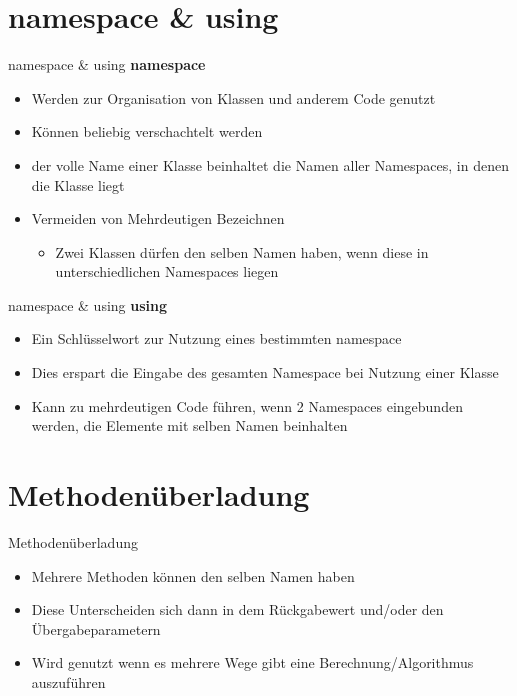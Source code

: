 \section{namespace \& using}
\begin{frame}{namespace \& using}
	\textbf{namespace}\\
	\begin{itemize}
		\item Werden zur Organisation von Klassen und anderem Code genutzt 
		\item Können beliebig verschachtelt werden
		\item der volle Name einer Klasse beinhaltet die Namen aller Namespaces, in denen die Klasse liegt
		\item Vermeiden von Mehrdeutigen Bezeichnen 
		\begin{itemize}
			\item Zwei Klassen dürfen den selben Namen haben, wenn diese in unterschiedlichen Namespaces liegen		
		\end{itemize}
	\end{itemize}	
	
\end{frame}

\begin{frame}{namespace \& using}
	\textbf{using}\\
	\begin{itemize}
		\item Ein Schlüsselwort zur Nutzung eines bestimmten \alert{namespace}
		\item Dies erspart die Eingabe des gesamten Namespace bei Nutzung einer Klasse
		\item Kann zu mehrdeutigen Code führen, wenn 2 Namespaces eingebunden werden, die Elemente mit selben Namen beinhalten
	\end{itemize}
	
\end{frame}

\section{Methodenüberladung}
\begin{frame}{Methodenüberladung}
	\begin{itemize}
		\item Mehrere Methoden können den selben Namen haben
		\item Diese Unterscheiden sich dann in dem Rückgabewert und/oder den Übergabeparametern
		\item Wird genutzt wenn es mehrere Wege gibt eine Berechnung/Algorithmus auszuführen
	\end{itemize}
	
\end{frame}

